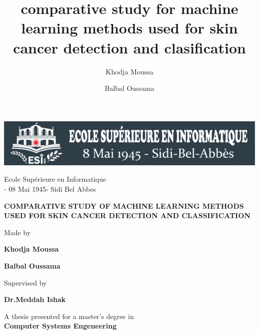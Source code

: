 \documentclass[12pt,a4paper]{article}
\title{comparative study for machine learning methods used for skin cancer detection and clasification}
\author{
	Khodja Moussa
	\and
	Balbal Oussama
}
\date{}
\begin{document}
	\begin{titlepage}
		\begin{center}	
			\Large
			
			\includegraphics[]{esi-logo.png}
			
			Ecole Supérieure en Informatique\\
			- 08 Mai 1945- Sidi Bel Abbes
			
			\hrulefill
			
			\vspace{0.5cm}
			\textbf{COMPARATIVE STUDY OF MACHINE LEARNING METHODS USED FOR SKIN CANCER DETECTION AND CLASSIFICATION}
			
			\LARGE
			
			\vspace{1.5cm}
			Made by
			\vspace{0.5cm}
			
			\textbf{Khodja Moussa}
			
			\textbf{Balbal Oussama}
			
			\vspace{1.5cm}
			Supervised by
			\vspace{0.5cm}
			
			\textbf{Dr.Meddah Ishak}			
			
			\vfill
			A thesis presented for a master's degree in\\
			\textbf{Computer Systems Engeneering}
			\vspace{0.8cm}
		\end{center}
	\end{titlepage}
\end{document}
